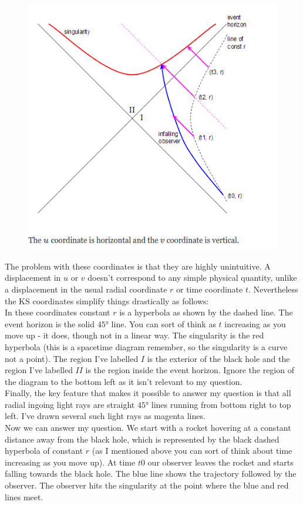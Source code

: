 \begin{figure}[h!]
	\centering
	\includegraphics[width=0.7\linewidth]{gfx/kruskalszekerescoordInfallingObs}
	\caption{}
	\label{fig:kruskalszekerescoordinfallingobs}
\end{figure}
The problem with these coordinates is that they are highly unintuitive. A displacement in $u$ or $v$ doesn't correspond to any simple physical quantity, unlike a displacement in the usual radial coordinate $r$ or time coordinate $t$. Nevertheless the KS coordinates simplify things drastically as follows:
\\
In these coordinates constant $r$ is a hyperbola as shown by the dashed line. The event horizon is the solid $45°$ line. You can sort of think as $t$ increasing as you move up - it does, though not in a linear way. The singularity is the red hyperbola (this is a spacetime diagram remember, so the singularity is a curve not a point). The region I've labelled $I$ is the exterior of the black hole and the region I've labelled $II$ is the region inside the event horizon. Ignore the region of the diagram to the bottom left as it isn't relevant to my question.
\\
Finally, the key feature that makes it possible to answer my question is that all radial ingoing light rays are straight $45°$ lines running from bottom right to top left. I've drawn several such light rays as magenta lines.\\

Now we can answer my question. We start with a rocket hovering at a constant distance away from the black hole, which is represented by the black dashed hyperbola of constant $r$ (as I mentioned above you can sort of think about time increasing as you move up). At time $t0$ our observer leaves the rocket and starts falling towards the black hole. The blue line shows the trajectory followed by the observer. The observer hits the singularity at the point where the blue and red lines meet.

